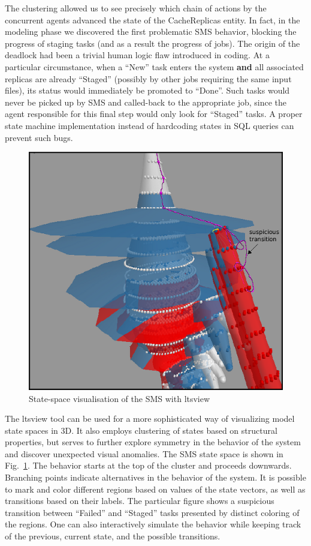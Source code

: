 \documentclass[sort&compress,preprint,3p]{elsarticle}
\begin{document}
The clustering
allowed us to see precisely which chain of actions by the concurrent agents
advanced the state of the CacheReplicas entity. In fact, in the modeling phase we discovered the first problematic
SMS behavior, blocking the progress of staging
tasks (and as a result the progress of jobs). The origin of the deadlock had been a
trivial human logic flaw introduced in coding. At a particular circumstance,
when a ``New'' task enters the system \textbf{and} all associated replicas
are already ``Staged'' (possibly by other jobs requiring the same input files),
its status would immediately be promoted to ``Done''.
Such tasks would never be picked up by SMS and called-back to the appropriate job, 
since the agent responsible for this final step would only look for ``Staged'' tasks.
A proper state machine implementation
instead of hardcoding states in SQL queries can prevent such bugs.
\begin{figure}[bp!]
\vspace{-10 pt}
\includegraphics[width=0.5\linewidth,keepaspectratio=true]{./Figure8.png}
\centering
\caption{State-space visualisation of the SMS with ltsview}
\label{fig:LTSviewVisualisation}
\end{figure}%

The ltsview tool can be used for a more sophisticated way of visualizing model state spaces in 3D.
It also employs clustering of states based on structural properties, but serves to further 
explore symmetry in the behavior of the system and discover unexpected visual anomalies.
The SMS state space is shown in Fig.~\ref{fig:LTSviewVisualisation}. 
The behavior 
starts at the top of the cluster and proceeds downwards. Branching points indicate 
alternatives in the behavior of the system. It is possible to mark and color different
regions based on values of the state vectors, as well as transitions based on their labels.
The particular figure shows a suspicious transition between ``Failed'' and ``Staged'' tasks presented
by distinct coloring of the regions. One can also interactively simulate the behavior while keeping 
track of the previous, current state, and the possible transitions.
\end{document}
